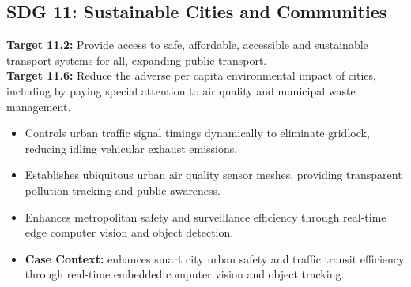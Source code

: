 \subsection{SDG 11: Sustainable Cities and Communities}
\noindent\textbf{Target 11.2:} Provide access to safe, affordable, accessible and sustainable transport systems for all, expanding public transport. \\
\noindent\textbf{Target 11.6:} Reduce the adverse per capita environmental impact of cities, including by paying special attention to air quality and municipal waste management.
\begin{itemize}
  \item Controls urban traffic signal timings dynamically to eliminate gridlock, reducing idling vehicular exhaust emissions.
  \item Establishes ubiquitous urban air quality sensor meshes, providing transparent pollution tracking and public awareness.
  \item Enhances metropolitan safety and surveillance efficiency through real-time edge computer vision and object detection.
  \item \textbf{Case Context:} enhances smart city urban safety and traffic transit efficiency through real-time embedded computer vision and object tracking.
\end{itemize}
